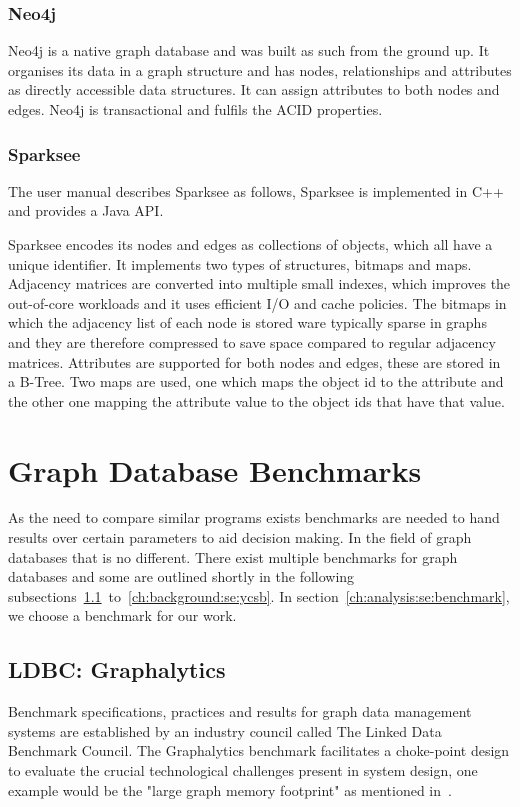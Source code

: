 \subsubsection{Neo4j}
Neo4j is a native graph database and was built as such from the ground up.
It organises its data in a graph structure and has nodes, relationships and attributes as directly accessible data structures.
It can assign attributes to both nodes and edges.
Neo4j is transactional and fulfils the ACID properties.~\cite{Neo4jInc.2006}

\subsubsection{Sparksee}
The user manual describes Sparksee as follows, 
Sparksee is implemented in C++ and provides a Java API.

Sparksee encodes its nodes and edges as collections of objects, which all have a unique identifier.
It implements two types of structures, bitmaps and maps.
Adjacency matrices are converted into multiple small indexes,
which improves the out-of-core workloads and it uses efficient I/O and cache policies.
The bitmaps in which the adjacency list of each node is stored ware typically sparse in graphs and they are therefore compressed to save space compared to regular adjacency matrices.
Attributes are supported for both nodes and edges,
these are stored in a B-Tree.
Two maps are used, one which maps the object id to the attribute and the other one mapping the attribute value to the object ids that have that value.\cite{TaoShen}

\section{Graph Database Benchmarks}
\label{ch:background:se:graphDatabaseBenchmarks}
As the need to compare similar programs exists benchmarks are needed to hand results over certain parameters to aid decision making.
In the field of graph databases that is no different.
There exist multiple benchmarks for graph databases and some are outlined shortly in the following subsections~\ref{ch:background:se:ldbcGraphalytics}~to~\ref{ch:background:se:ycsb}.
In section~\ref{ch:analysis:se:benchmark},
we choose a benchmark for our work.

\subsection{LDBC: Graphalytics}
\label{ch:background:se:ldbcGraphalytics}
Benchmark specifications, practices and results for graph data management systems are established by an industry council called The Linked Data Benchmark Council.
The Graphalytics benchmark facilitates a choke-point design to evaluate the crucial technological challenges present in system design,
one example would be the "large graph memory footprint" as mentioned in~\cite[2]{Capota2015c}.

